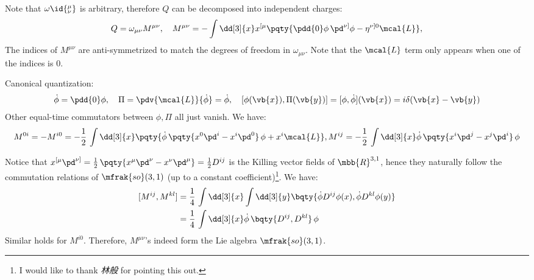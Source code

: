 \documentclass[a4paper,10pt]{article}
\begin{document}
\begin{itemize}
	Note that $\omega\id{^\mu_\nu}$ is arbitrary, therefore $Q$ can be decomposed into independent charges:
	\begin{equation}
		Q = \omega_{\mu\nu} M^{\mu\nu},\quad
		M^{\mu\nu}
		= - \int \dd[3]{x}
		x^{[\mu} \pqty{
			\pdd{0}\phi\,\pd^{\nu]}\phi
			- \eta^{\nu] 0} \mcal{L}
		},
	\end{equation}
	The indices of $M^{\mu\nu}$ are anti-symmetrized to match the degrees of freedom in $\omega_{\mu\nu}$. Note that the $\mcal{L}$ term only appears when one of the indices is 0. 
	
	Canonical quantization:
	\begin{gather}
		\dot{\phi} = \pdd{0}\phi,\quad
		\Pi = \pdv{\mcal{L}}{\dot{\phi}}
		= \dot{\phi},\quad
		[\phi(\vb{x}),\Pi(\vb{y})]
		= [\phi,\dot{\phi}](\vb{x})
		= i\delta(\vb{x} - \vb{y})
	\end{gather}
	Other equal-time commutators between $\phi,\Pi$ all just vanish. We have:
	\begin{equation}
		M^{0i} = -M^{i0}
		= -\frac{1}{2}\,
		\int \dd[3]{x} \pqty{
			\dot{\phi}\,\pqty{
				x^0 \pd^i
				- x^i \pd^0
			}\,\phi
			+ x^i \mcal{L}
		},\\
		M^{ij}
		= -\frac{1}{2}\,\int \dd[3]{x}
			\dot{\phi}\,\pqty{
				x^i \pd^j
				- x^j \pd^i
			}\,\phi
	\end{equation}
	
	Notice that $
		x^{[\mu} \pd^{\nu]}
		= \frac{1}{2}\,\pqty{
			x^\mu \pd^\nu - x^\nu \pd^\mu
		} = \frac{1}{2} D^{ij}
	$ is the Killing vector fields of $\mbb{R}^{3,1}$, hence they naturally follow the commutation relations of $\mfrak{so}(3,1)$ (up to a constant coefficient)\footnote{
		I would like to thank \textit{林般} for pointing this out. 
	}. We have:
	\begin{equation}
	\begin{aligned}
		[M^{ij}, M^{kl}]
		&= \frac{1}{4}\,\int \dd[3]{x}
			\int \dd[3]{y} \bqty{
				\dot{\phi} D^{ij}\phi(x),
				\dot{\phi} D^{kl}\phi(y)
			} \\
		&= \frac{1}{4}\,\int \dd[3]{x}
			\dot{\phi}\,\bqty{
				 D^{ij}, D^{kl}
			}\,\phi
	\end{aligned}
	\end{equation}
	Similar holds for $M^{i0}$. Therefore, $M^{\mu\nu}$'s indeed form the Lie algebra $\mfrak{so}(3,1)$. 
	\qedfull
	
	\end{itemize}

\printbibliography[%
	,heading = bibintoc
]
\end{document}
